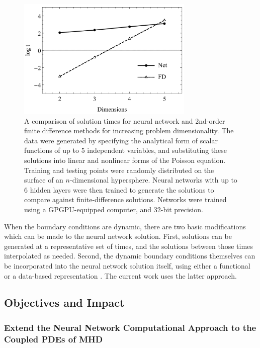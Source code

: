 \documentclass{article}
\begin{document}
\begin{figure}
  \centering
  \includegraphics[width=0.75\textwidth]{Avrutskiy_2020.png}
  \caption{A comparison of solution times for neural network and 2nd-order finite difference methods for increasing problem dimensionality. The data were generated by specifying the analytical form of scalar functions of up to 5 independent variables, and substituting these solutions into linear and nonlinear forms of the Poisson equation. Training and testing points were randomly distributed on the surface of an $n$-dimensional hypersphere. Neural networks with up to 6 hidden layers were then trained to generate the solutions to compare against finite-difference solutions. Networks were trained using a GPGPU-equipped computer, and 32-bit precision. \cite{Avrutskiy2020}}
  \label{fig:Avrutskiy_2020}
\end{figure}

When the boundary conditions are dynamic, there are two basic modifications which can be made to the neural network solution. First, solutions can be generated at a representative set of times, and the solutions between those times interpolated as needed. Second, the dynamic boundary conditions themselves can be incorporated into the neural network solution itself, using either a functional or a data-based representation \cite{Lagaris1998}. The current work uses the latter approach.

\subsection{Objectives and Impact}

\subsubsection{Extend the Neural Network Computational Approach to the Coupled PDEs of MHD}
\end{document}
